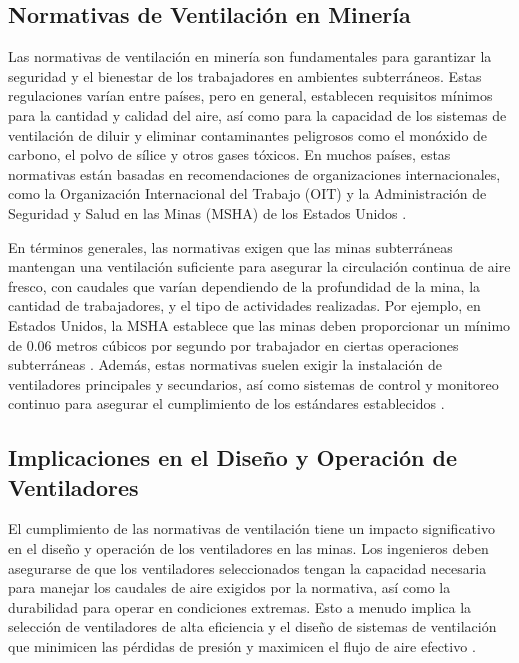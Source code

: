 \subsection{Normativas de Ventilación en Minería}

Las normativas de ventilación en minería son fundamentales para garantizar la seguridad y el bienestar de los trabajadores en ambientes subterráneos. Estas regulaciones varían entre países, pero en general, establecen requisitos mínimos para la cantidad y calidad del aire, así como para la capacidad de los sistemas de ventilación de diluir y eliminar contaminantes peligrosos como el monóxido de carbono, el polvo de sílice y otros gases tóxicos. En muchos países, estas normativas están basadas en recomendaciones de organizaciones internacionales, como la Organización Internacional del Trabajo (OIT) y la Administración de Seguridad y Salud en las Minas (MSHA) de los Estados Unidos \cite{msha2020ventilation}.

En términos generales, las normativas exigen que las minas subterráneas mantengan una ventilación suficiente para asegurar la circulación continua de aire fresco, con caudales que varían dependiendo de la profundidad de la mina, la cantidad de trabajadores, y el tipo de actividades realizadas. Por ejemplo, en Estados Unidos, la MSHA establece que las minas deben proporcionar un mínimo de 0.06 metros cúbicos por segundo por trabajador en ciertas operaciones subterráneas \cite{osha2019mining}. Además, estas normativas suelen exigir la instalación de ventiladores principales y secundarios, así como sistemas de control y monitoreo continuo para asegurar el cumplimiento de los estándares establecidos \cite{noll2014overview}.

\subsection{Implicaciones en el Diseño y Operación de Ventiladores}

El cumplimiento de las normativas de ventilación tiene un impacto significativo en el diseño y operación de los ventiladores en las minas. Los ingenieros deben asegurarse de que los ventiladores seleccionados tengan la capacidad necesaria para manejar los caudales de aire exigidos por la normativa, así como la durabilidad para operar en condiciones extremas. Esto a menudo implica la selección de ventiladores de alta eficiencia y el diseño de sistemas de ventilación que minimicen las pérdidas de presión y maximicen el flujo de aire efectivo \cite{mutmansky2010ventilation}.

